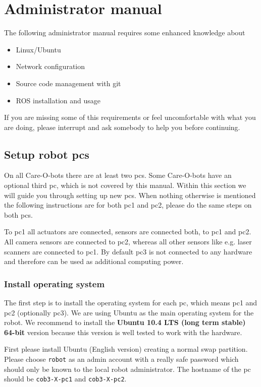 
\chapter{Administrator manual}
\label{chap:admin}

The following administrator manual requires some enhanced knowledge about
\begin{itemize}
\item Linux/Ubuntu
\item Network configuration
\item Source code management with git
\item ROS installation and usage
\end{itemize}
If you are missing some of this requirements or feel uncomfortable with what you are doing, please interrupt and ask somebody to help you before continuing.

\section{Setup robot pcs}
On all Care-O-bots there are at least two pcs. Some Care-O-bots have an optional third pc, which is not covered by this manual. Within this section we will guide you through setting up new pcs. When nothing otherwise is mentioned the following instructions are for both pc1 and pc2, please do the same steps on both pcs.

To pc1 all actuators are connected, sensors are connected both, to pc1 and pc2. All camera sensors are connected to pc2, whereas all other sensors like e.g. laser scanners are connected to pc1. By default pc3 is not connected to any hardware and therefore can be used as additional computing power.

\subsection{Install operating system}
The first step is to install the operating system for each pc, which means pc1 and pc2 (optionally pc3). We are using Ubuntu as the main operating system for the robot. We recommend to install the \textbf{Ubuntu 10.4 LTS (long term stable) 64-bit} version because this version is well tested to work with the hardware. 

First please install Ubuntu (English version) creating a normal swap partition. Please choose \texttt{robot} as an admin account with a really safe password which should only be known to the local robot administrator. The hostname of the pc should be \texttt{cob3-X-pc1} and \texttt{cob3-X-pc2}.

